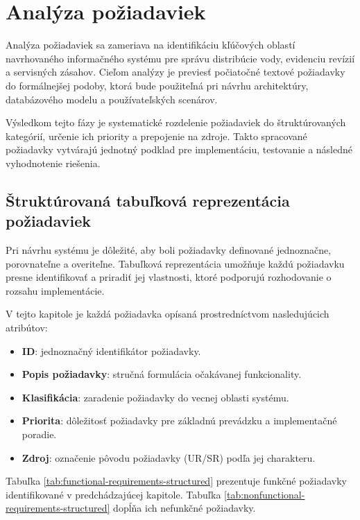 
\chapter{Analýza požiadaviek}\label{ch:requirements-analysis}

Analýza požiadaviek sa zameriava na identifikáciu kľúčových oblastí navrhovaného informačného systému pre správu distribúcie vody, evidenciu revízií a servisných zásahov. Cieľom analýzy je previesť počiatočné textové požiadavky do formálnejšej podoby, ktorá bude použiteľná pri návrhu architektúry, databázového modelu a používateľských scenárov.

Výsledkom tejto fázy je systematické rozdelenie požiadaviek do štruktúrovaných kategórií, určenie ich priority a prepojenie na zdroje. Takto spracované požiadavky vytvárajú jednotný podklad pre implementáciu, testovanie a následné vyhodnotenie riešenia.

\section{Štruktúrovaná tabuľková reprezentácia požiadaviek}

Pri návrhu systému je dôležité, aby boli požiadavky definované jednoznačne, porovnateľne a overiteľne. Tabuľková reprezentácia umožňuje každú požiadavku presne identifikovať a priradiť jej vlastnosti, ktoré podporujú rozhodovanie o rozsahu implementácie.

V tejto kapitole je každá požiadavka opísaná prostredníctvom nasledujúcich atribútov:

\begin{itemize}
\item \textbf{ID}: jednoznačný identifikátor požiadavky.
\item \textbf{Popis požiadavky}: stručná formulácia očakávanej funkcionality.
\item \textbf{Klasifikácia}: zaradenie požiadavky do vecnej oblasti systému.
\item \textbf{Priorita}: dôležitosť požiadavky pre základnú prevádzku a implementačné poradie.
\item \textbf{Zdroj}: označenie pôvodu požiadavky (UR/SR) podľa jej charakteru.
\end{itemize}

Tabuľka \ref{tab:functional-requirements-structured} prezentuje funkčné požiadavky identifikované v predchádzajúcej kapitole. Tabuľka \ref{tab:nonfunctional-requirements-structured} dopĺňa ich nefunkčné požiadavky.

